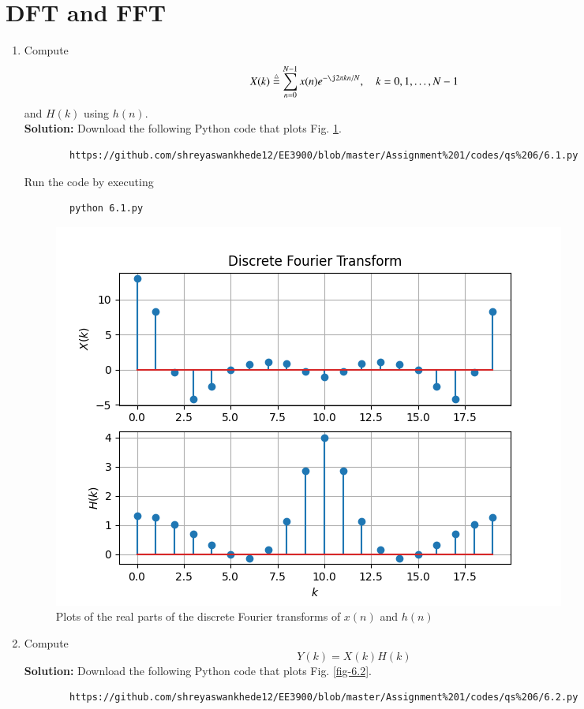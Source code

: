 \documentclass[journal,12pt,twocolumn]{IEEEtran}
\newcommand{\solution}{\noindent \textbf{Solution: }}
\numberwithin{equation}{section}
\renewcommand\thesection{\arabic{section}}
\newcommand{\define}{\stackrel{\triangle}{=}}
\renewcommand\thesection{\arabic{section}}
\begin{document}
\section{DFT and FFT}
\begin{enumerate}[label=\thesection.\arabic*]
\item
Compute
\begin{equation}
X(k) \define \sum _{n=0}^{N-1}x(n) e^{-\j2\pi kn/N}, \quad k = 0,1,\dots, N-1
\end{equation}
and $H(k)$ using $h(n)$.\\
\solution Download the following Python code that plots Fig. \ref{fig-6.1}.
\begin{lstlisting}
		https://github.com/shreyaswankhede12/EE3900/blob/master/Assignment%201/codes/qs%206/6.1.py		
\end{lstlisting}
	
	Run the code by executing
	\begin{lstlisting}
		python 6.1.py
	\end{lstlisting}

	\begin{figure}[!ht]
		\centering
		\includegraphics[width=\columnwidth]{figs/6.1.png}
		\caption{Plots of the real parts of the discrete Fourier transforms of $x(n)$ and $h(n)$}
		\label{fig-6.1}	
	\end{figure}
\item Compute 
\begin{equation}
Y(k) = X(k)H(k)
\end{equation}
\solution Download the following Python code that plots Fig. \ref{fig-6.2}.
	\begin{lstlisting}
		https://github.com/shreyaswankhede12/EE3900/blob/master/Assignment%201/codes/qs%206/6.2.py
	\end{lstlisting}
	

\end{enumerate}
\end{document}
